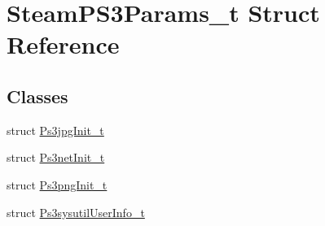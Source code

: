 \hypertarget{structSteamPS3Params__t}{}\section{Steam\+P\+S3\+Params\+\_\+t Struct Reference}
\label{structSteamPS3Params__t}
\subsection*{Classes}
\begin{DoxyCompactItemize}
\item 
struct \hyperlink{structSteamPS3Params__t_1_1Ps3jpgInit__t}{Ps3jpg\+Init\+\_\+t}
\item 
struct \hyperlink{structSteamPS3Params__t_1_1Ps3netInit__t}{Ps3net\+Init\+\_\+t}
\item 
struct \hyperlink{structSteamPS3Params__t_1_1Ps3pngInit__t}{Ps3png\+Init\+\_\+t}
\item 
struct \hyperlink{structSteamPS3Params__t_1_1Ps3sysutilUserInfo__t}{Ps3sysutil\+User\+Info\+\_\+t}
\end{DoxyCompactItemize}
